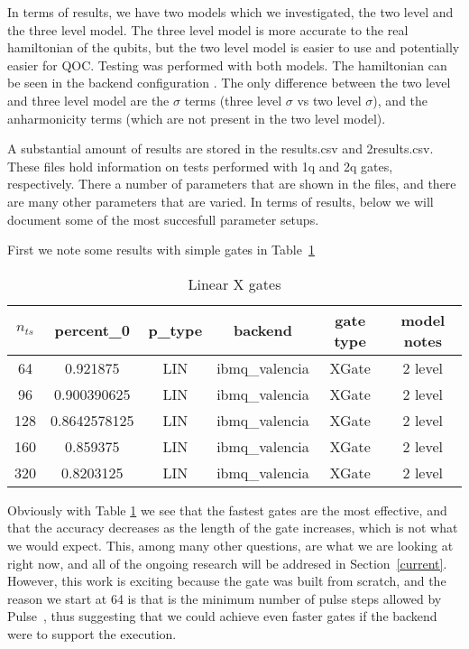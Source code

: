 \documentclass[12pt]{article}
\begin{document}
In terms of results, we have two models which we investigated, the two level and
the three level model. The three level model is more accurate to the real
hamiltonian of the qubits, but the two level model is easier to use and
potentially easier for QOC. Testing was performed with both models. The
hamiltonian can be seen in the backend configuration
\cite{alexander_qiskit_2020}. The only difference between the two level and
three level model are the $\sigma$ terms (three level $\sigma$ vs two level
$\sigma$), and the anharmonicity terms (which are not present in the two level
model).

A substantial amount of results are stored in the results.csv and 2results.csv.
These files hold information on tests performed with 1q and 2q gates,
respectively. There a number of parameters that are shown in the files, and
there are many other parameters that are varied. In terms of results, below we
will document some of the most succesfull parameter setups. 
\newline

First we note some results with simple gates in Table~\ref{table:linX}
\newline

\begin{table}
    \begin{tabular}{||c c c c c c||} 
    \hline
    $n_{ts}$ & percent\_0 & p\_type & backend & gate type & model notes\\ [0.5ex] 
    \hline
64 &0.921875 &LIN &ibmq\_valencia &XGate &2 level\\
96 &0.900390625 &LIN &ibmq\_valencia &XGate &2 level\\
128 &0.8642578125 &LIN &ibmq\_valencia &XGate &2 level\\
160 &0.859375 &LIN &ibmq\_valencia &XGate &2 level\\
320 &0.8203125 &LIN &ibmq\_valencia &XGate &2 level\\
    \hline
   \end{tabular}
   \caption{Linear X gates}
   \label{table:linX}
\end{table}

  Obviously with Table \ref{table:linX} we see that the fastest gates are the
  most effective, and that the accuracy decreases as the length of the gate
  increases, which is not what we would expect. This, among many other
  questions, are what we are looking at right now, and all of the ongoing
  research will be addresed in Section~\ref{current}. However, this work is
  exciting because the gate was built from scratch, and the reason we start at
  64 is that is the minimum number of pulse steps allowed by
  Pulse~\cite{alexander_qiskit_2020}, thus suggesting that we could achieve even
  faster gates if the backend were to support the execution.
\end{document}
